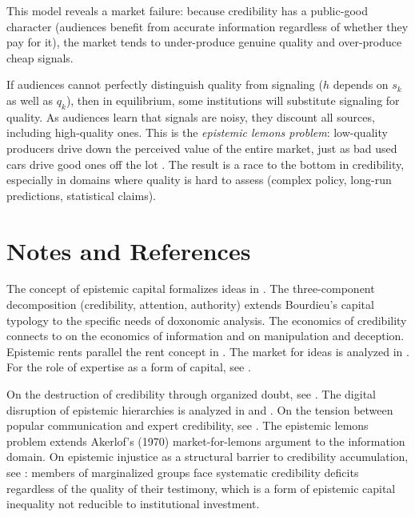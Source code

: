 This model reveals a market failure: because credibility has a public-good character (audiences benefit from accurate information regardless of whether they pay for it), the market tends to under-produce genuine quality and over-produce cheap signals.

\begin{proposition}
\label{prop:lemons}
If audiences cannot perfectly distinguish quality from signaling ($h$ depends on $s_k$ as well as $q_k$), then in equilibrium, some institutions will substitute signaling for quality.
As audiences learn that signals are noisy, they discount all sources, including high-quality ones.
This is the \emph{epistemic lemons problem}: low-quality producers drive down the perceived value of the entire market, just as bad used cars drive good ones off the lot \autocite{akerlof2015}.
The result is a race to the bottom in credibility, especially in domains where quality is hard to assess (complex policy, long-run predictions, statistical claims).
\end{proposition}


\section{Notes and References}
\label{sec:ch6-notes}

The concept of epistemic capital formalizes ideas in \textcite{bourdieu1984, bourdieu1991}.
The three-component decomposition (credibility, attention, authority) extends Bourdieu's capital typology to the specific needs of doxonomic analysis.
The economics of credibility connects to \textcite{stigler1961} on the economics of information and \textcite{akerlof2015} on manipulation and deception.
Epistemic rents parallel the rent concept in \textcite{stiglitz2012}.
The market for ideas is analyzed in \textcite{coase1974}.
For the role of expertise as a form of capital, see \textcite{eyal2019}.

On the destruction of credibility through organized doubt, see \textcite{oreskes2010}.
The digital disruption of epistemic hierarchies is analyzed in \textcite{benkler2018} and \textcite{zuboff2019}.
On the tension between popular communication and expert credibility, see \textcite{eyal2019}.
The epistemic lemons problem extends Akerlof's (1970) market-for-lemons argument to the information domain.
On epistemic injustice as a structural barrier to credibility accumulation, see \textcite{fricker2007}: members of marginalized groups face systematic credibility deficits regardless of the quality of their testimony, which is a form of epistemic capital inequality not reducible to institutional investment.

